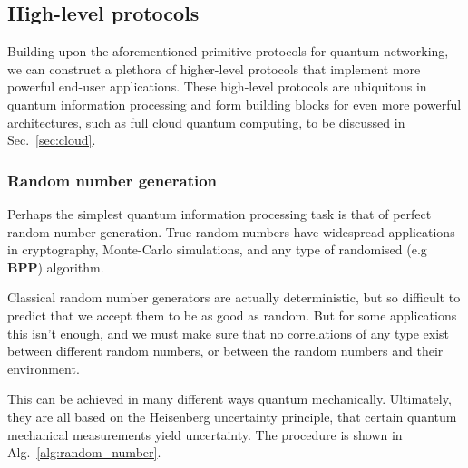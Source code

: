 %
%

\subsection{High-level protocols} 

Building upon the aforementioned primitive protocols for quantum networking, we can construct a plethora of higher-level protocols that implement more powerful end-user applications. These high-level protocols are ubiquitous in quantum information processing and form building blocks for even more powerful architectures, such as full cloud quantum computing, to be discussed in Sec.~\ref{sec:cloud}.

%
%

\subsubsection{Random number generation} 

Perhaps the simplest quantum information processing task is that of perfect random number generation. True random numbers have widespread applications in cryptography, Monte-Carlo simulations, and any type of randomised (e.g \textbf{BPP}) algorithm.

Classical random number generators are actually deterministic, but so difficult to predict that we accept them to be as good as random. But for some applications this isn't enough, and we must make sure that no correlations of any type exist between different random numbers, or between the random numbers and their environment.

This can be achieved in many different ways quantum mechanically. Ultimately, they are all based on the Heisenberg uncertainty principle, that certain quantum mechanical measurements yield uncertainty. The procedure is shown in Alg.~\ref{alg:random_number}.

